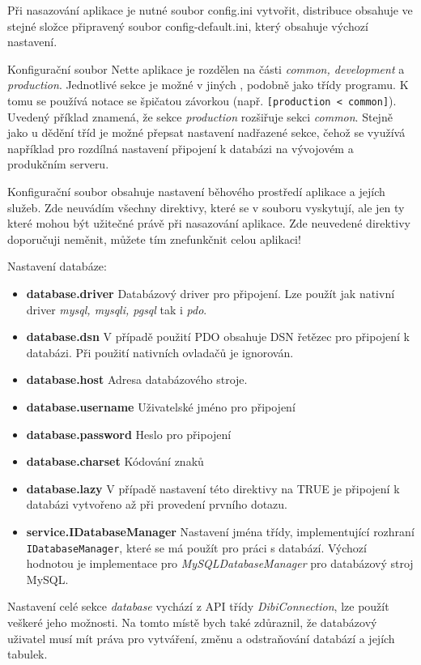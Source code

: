 \documentclass[11pt,twoside,a4paper]{book}
\begin{document}
Při nasazování aplikace je nutné soubor config.ini vytvořit, distribuce obsahuje ve stejné složce připravený soubor config-default.ini, který obsahuje výchozí nastavení.

Konfigurační soubor Nette aplikace je rozdělen na části \textit{common, development} a \textit{production}. Jednotlivé sekce je možné v jiných , podobně jako třídy programu. K tomu se používá notace se špičatou závorkou (např. \texttt{[production < common]}). Uvedený příklad znamená, že sekce \textit{production} rozšiřuje sekci \textit{common}. Stejně jako u dědění tříd je možné přepsat nastavení nadřazené sekce, čehož se využívá například pro rozdílná nastavení připojení k databázi na vývojovém a produkčním serveru.

Konfigurační soubor obsahuje nastavení běhového prostředí aplikace a jejích služeb. Zde neuvádím všechny direktivy, které se v souboru vyskytují, ale jen ty které mohou být užitečné právě při nasazování aplikace. Zde neuvedené direktivy doporučuji neměnit, můžete tím znefunkčnit celou aplikaci!

Nastavení databáze:
\begin{itemize}
\item \textbf{database.driver} Databázový driver pro připojení. Lze použít jak nativní driver \textit{mysql, mysqli, pgsql} tak i \textit{pdo}.
\item \textbf{database.dsn} V případě použití PDO obsahuje DSN řetězec pro připojení k databázi. Při použití nativních ovladačů je ignorován.
\item \textbf{database.host} Adresa databázového stroje.
\item \textbf{database.username} Uživatelské jméno pro připojení
\item \textbf{database.password} Heslo pro připojení
\item \textbf{database.charset} Kódování znaků
\item \textbf{database.lazy} V případě nastavení této direktivy na TRUE je připojení k databázi vytvořeno až při provedení prvního dotazu.
\item \textbf{service.IDatabaseManager} Nastavení jména třídy, implementující rozhraní \texttt{IDatabaseManager}, které se má použít pro práci s databází. Výchozí hodnotou je implementace pro \textit{MySQLDatabaseManager} pro databázový stroj MySQL.
\end{itemize}
Nastavení celé sekce \textit{database} vychází z API třídy \textit{DibiConnection}\cite{dibiconnection}, lze použít veškeré jeho možnosti. Na tomto místě bych také zdůraznil, že databázový uživatel musí mít práva pro vytváření, změnu a odstraňování databází a jejích tabulek.
\end{document}
